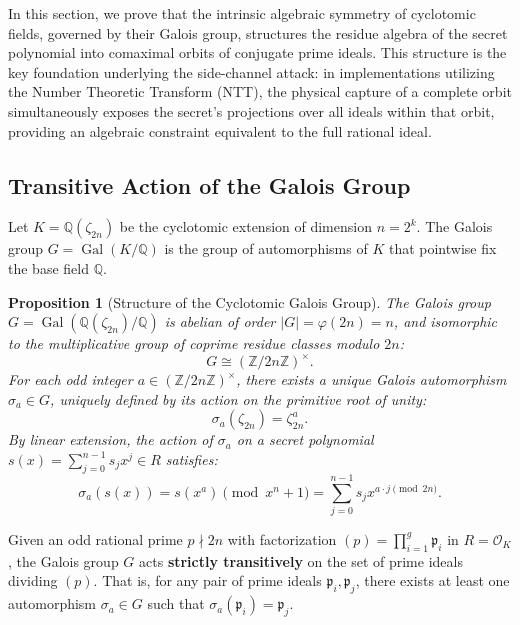 \documentclass[11pt,a4paper]{article}
\theoremstyle{plain}
\newtheorem{proposicion}[teorema]{Proposition}
\theoremstyle{definition}
\numberwithin{equation}{section}
\newcommand{\QQ}{\mathbb{Q}}
\newcommand{\ZZ}{\mathbb{Z}}
\newcommand{\cO}{\mathcal{O}}
\newcommand{\fkp}{\mathfrak{p}}
\newcommand{\Gal}{\operatorname{Gal}}
\begin{document}
In this section, we prove that the intrinsic algebraic symmetry of cyclotomic fields, governed by their Galois group, structures the residue algebra of the secret polynomial into comaximal orbits of conjugate prime ideals. This structure is the key foundation underlying the side-channel attack: in implementations utilizing the Number Theoretic Transform (NTT), the physical capture of a complete orbit simultaneously exposes the secret's projections over all ideals within that orbit, providing an algebraic constraint equivalent to the full rational ideal.

\subsection{Transitive Action of the Galois Group}
\label{subsec:accion_galois}

Let $K = \QQ(\zeta_{2n})$ be the cyclotomic extension of dimension $n = 2^k$. The Galois group $G = \Gal(K/\QQ)$ is the group of automorphisms of $K$ that pointwise fix the base field $\QQ$.

\begin{proposicion}[Structure of the Cyclotomic Galois Group]
\label{prop:grupo_galois}
The Galois group $G = \Gal(\QQ(\zeta_{2n})/\QQ)$ is abelian of order $|G| = \varphi(2n) = n$, and isomorphic to the multiplicative group of coprime residue classes modulo $2n$:
\begin{equation}
G \cong (\ZZ/2n\ZZ)^\times.
\end{equation}
For each odd integer $a \in (\ZZ/2n\ZZ)^\times$, there exists a unique Galois automorphism $\sigma_a \in G$, uniquely defined by its action on the primitive root of unity:
\begin{equation}
\sigma_a(\zeta_{2n}) = \zeta_{2n}^a.
\end{equation}
By linear extension, the action of $\sigma_a$ on a secret polynomial $s(x) = \sum_{j=0}^{n-1} s_j x^j \in R$ satisfies:
\begin{equation}
\sigma_a(s(x)) = s(x^a) \pmod{x^n+1} = \sum_{j=0}^{n-1} s_j x^{a \cdot j \pmod{2n}}.
\end{equation}
\end{proposicion}

Given an odd rational prime $p \nmid 2n$ with factorization $(p) = \prod_{i=1}^g \fkp_i$ in $R = \cO_K$, the Galois group $G$ acts \textbf{strictly transitively} on the set of prime ideals dividing $(p)$. That is, for any pair of prime ideals $\fkp_i, \fkp_j$, there exists at least one automorphism $\sigma_a \in G$ such that $\sigma_a(\fkp_i) = \fkp_j$.
\end{document}
